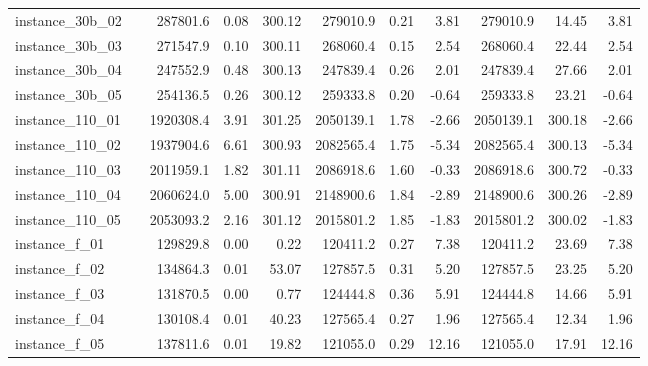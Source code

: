 \documentclass[12pt,a4paper,openright,twoside]{book}
\begin{document}
\begin{table}[H]
{\begin{tabular}{|ll|rrr|rrr|rrr|}
instance\_30b\_02              &     &  287801.6 &    0.08 &   300.12 &  279010.9 &     0.21 &    3.81 &   279010.9 &    14.45 &     3.81  \\ 
instance\_30b\_03              &     &  271547.9 &    0.10 &   300.11 &  268060.4 &     0.15 &    2.54 &   268060.4 &    22.44 &     2.54  \\ 
instance\_30b\_04              &     &  247552.9 &    0.48 &   300.13 &  247839.4 &     0.26 &    2.01 &   247839.4 &    27.66 &     2.01  \\ 
instance\_30b\_05              &     &  254136.5 &    0.26 &   300.12 &  259333.8 &     0.20 &   -0.64 &   259333.8 &    23.21 &    -0.64  \\ 
instance\_110\_01             &     &  1920308.4 &    3.91 &   301.25 &  2050139.1 &     1.78 &   -2.66 &   2050139.1 &   300.18 &    -2.66  \\ 
instance\_110\_02             &     &  1937904.6 &    6.61 &   300.93 &  2082565.4 &     1.75 &   -5.34 &   2082565.4 &   300.13 &    -5.34  \\ 
instance\_110\_03             &     &  2011959.1 &    1.82 &   301.11 &  2086918.6 &     1.60 &   -0.33 &   2086918.6 &   300.72 &    -0.33  \\ 
instance\_110\_04             &     &  2060624.0 &    5.00 &   300.91 &  2148900.6 &     1.84 &   -2.89 &   2148900.6 &   300.26 &    -2.89  \\ 
instance\_110\_05             &     &  2053093.2 &    2.16 &   301.12 &  2015801.2 &     1.85 &   -1.83 &   2015801.2 &   300.02 &    -1.83  \\ 
instance\_f\_01               &     &  129829.8 &    0.00 &      0.22 &  120411.2 &     0.27 &    7.38 &   120411.2 &    23.69 &      7.38 \\ 
instance\_f\_02               &     &  134864.3 &    0.01 &     53.07 &  127857.5 &     0.31 &    5.20 &   127857.5 &    23.25 &      5.20 \\ 
instance\_f\_03               &     &  131870.5 &    0.00 &      0.77 &  124444.8 &     0.36 &    5.91 &   124444.8 &    14.66 &      5.91 \\ 
instance\_f\_04               &     &  130108.4 &    0.01 &     40.23 &  127565.4 &     0.27 &    1.96 &   127565.4 &    12.34 &      1.96 \\ 
instance\_f\_05               &     &  137811.6 &    0.01 &     19.82 &  121055.0 &     0.29 &   12.16 &   121055.0 &    17.91 &     12.16 \\
\hline
\end{tabular}
}
\end{table}
\end{document}
